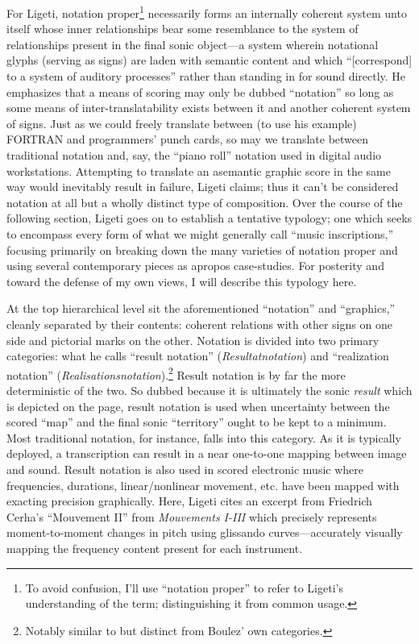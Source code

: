     For Ligeti, notation proper\footnote{To avoid confusion, I'll use ``notation proper'' to refer to Ligeti's understanding of the term; distinguishing it from common usage.} necessarily forms an internally coherent system unto itself whose inner relationships bear some resemblance to the system of relationships present in the final sonic object---a system wherein notational glyphs (serving as signs) are laden with semantic content and which ``[correspond] to a system of auditory processes'' rather than standing in for sound directly.\autocite[pg. 171 in Ernst et al., 1965.]{Ligeti_forthcoming} He emphasizes that a means of scoring may only be dubbed ``notation'' so long as some means of inter-translatability exists between it and another coherent system of signs. Just as we could freely translate between (to use his example) FORTRAN and programmers' punch cards, so may we translate between traditional notation and, say, the ``piano roll'' notation used in digital audio workstations. Attempting to translate an asemantic graphic score in the same way would inevitably result in failure, Ligeti claims; thus it can't be considered notation at all but a wholly distinct type of composition. Over the course of the following section, Ligeti goes on to establish a tentative typology; one which seeks to encompass every form of what we might generally call ``music inscriptions,'' focusing primarily on breaking down the many varieties of notation proper and using several contemporary pieces as apropos case-studies. For posterity and toward the defense of my own views, I will describe this typology here.

    At the top hierarchical level sit the aforementioned ``notation'' and ``graphics,'' cleanly separated by their contents: coherent relations with other signs on one side and pictorial marks on the other. Notation is divided into  two primary categories: what he calls ``result notation'' (\textit{Resultatnotation}) and ``realization notation'' (\textit{Realisationsnotation}).\footnote{Notably similar to but distinct from Boulez' own categories.} Result notation is by far the more deterministic of the two. So dubbed because it is ultimately the sonic \textit{result} which is depicted on the page, result notation is used when uncertainty between the scored ``map'' and the final sonic ``territory'' ought to be kept to a minimum. Most traditional notation, for instance, falls into this category. As it is typically deployed, a transcription can result in a near one-to-one mapping between image and sound. Result notation is also used in scored electronic music where frequencies, durations, linear/nonlinear movement, etc. have been mapped with exacting precision graphically. Here, Ligeti cites an excerpt from Friedrich Cerha's ``Mouvement II'' from \textit{Mouvements I-III} which precisely represents moment-to-moment changes in pitch using glissando curves---accurately visually mapping the frequency content present for each instrument.

